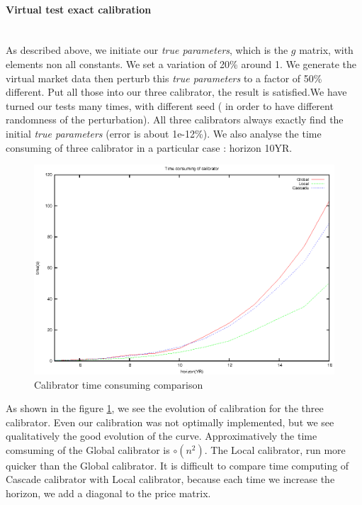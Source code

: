 \documentclass[a4paper,10pt]{article}
\begin{document}
\paragraph{Virtual test exact calibration}\mbox{}\\
As described above, we initiate our \textit{true parameters}, which is the $g$ matrix, with elements non all constants. We set a variation of 20\% around 1. We generate the virtual market data then perturb this \textit{true parameters} to a factor of 50\% different. Put all those into our three calibrator, the result is satisfied.We have turned our tests many times, with different seed ( in order to have different randomness of the perturbation).  All three calibrators always exactly find the initial \textit{true parameters} (error is about 1e-12\%). We also analyse the time consuming of three calibrator in a particular case : horizon 10YR.  
\begin {figure}[h]
\begin{center}
\includegraphics[scale=1.0]{CalibratorTime}
\end{center}
\caption{\label{fig:calibrator_time} Calibrator time consuming comparison}
\end {figure}
As shown in the figure \ref{fig:calibrator_time}, we see the evolution of calibration for the three calibrator. Even our calibration was not optimally implemented, but we see qualitatively the good evolution of the curve. Approximatively the time comsuming of the Global calibrator is $\circ(n^2)$. The Local calibrator, run more quicker than the Global calibrator. It is difficult to compare time computing of Cascade calibrator with Local calibrator, because each time we increase the horizon, we add a diagonal to the price matrix.
\end{document}
